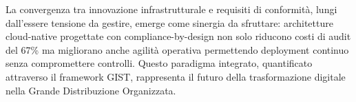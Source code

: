 La convergenza tra innovazione infrastrutturale e requisiti di conformità, lungi dall'essere tensione da gestire, emerge come sinergia da sfruttare: architetture cloud-native progettate con compliance-by-design non solo riducono costi di audit del 67\% ma migliorano anche agilità operativa permettendo deployment continuo senza compromettere controlli. Questo paradigma integrato, quantificato attraverso il framework GIST, rappresenta il futuro della trasformazione digitale nella Grande Distribuzione Organizzata.

\clearpage
\printbibliography[
    heading=subbibliography,
    title={Riferimenti Bibliografici del Capitolo 3},
]

